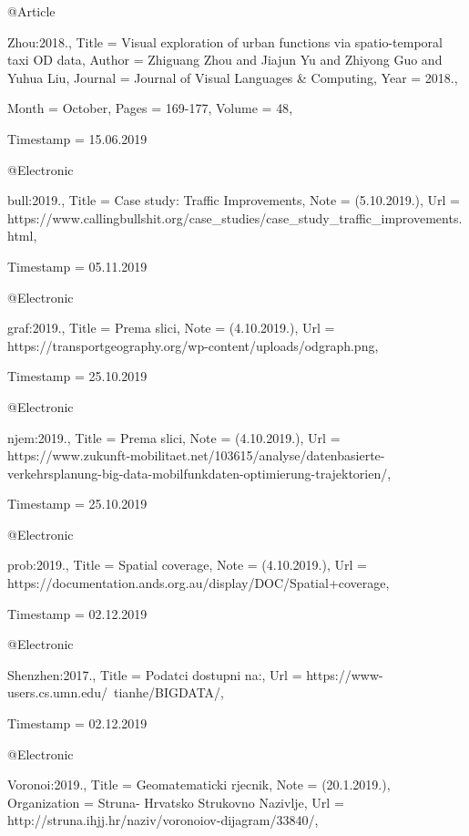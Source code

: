{{{@Article{Zhou:2018.,
  Title                    = {{Visual exploration of urban functions via spatio-temporal taxi OD data}},
  Author                   = {Zhiguang Zhou and Jiajun Yu and Zhiyong Guo and Yuhua Liu},
  Journal                  = {Journal of Visual Languages \& Computing},
  Year                     = {2018.},

  Month                    = {October},
  Pages                    = {169-177},
  Volume                   = {48},

  Timestamp                = {15.06.2019}
}

@Electronic{bull:2019.,
  Title                    = {Case study: Traffic Improvements},
  Note                     = {(5.10.2019.)},
  Url                      = {https://www.callingbullshit.org/case_studies/case_study_traffic_improvements.html},

  Timestamp                = {05.11.2019}
}

@Electronic{graf:2019.,
  Title                    = {Prema slici},
  Note                     = {(4.10.2019.)},
  Url                      = {https://transportgeography.org/wp-content/uploads/odgraph.png},

  Timestamp                = {25.10.2019}
}

@Electronic{njem:2019.,
  Title                    = {Prema slici},
  Note                     = {(4.10.2019.)},
  Url                      = {https://www.zukunft-mobilitaet.net/103615/analyse/datenbasierte-verkehrsplanung-big-data-mobilfunkdaten-optimierung-trajektorien/},

  Timestamp                = {25.10.2019}
}

@Electronic{prob:2019.,
  Title                    = {Spatial coverage},
  Note                     = {(4.10.2019.)},
  Url                      = {https://documentation.ands.org.au/display/DOC/Spatial+coverage},

  Timestamp                = {02.12.2019}
}

@Electronic{Shenzhen:2017.,
  Title                    = {Podatci dostupni na:},
  Url                      = {https://www-users.cs.umn.edu/~tianhe/BIGDATA/},

  Timestamp                = {02.12.2019}
}

@Electronic{Voronoi:2019.,
  Title                    = {Geomatematicki rjecnik},
  Note                     = {(20.1.2019.)},
  Organization             = {Struna- Hrvatsko Strukovno Nazivlje},
  Url                      = {http://struna.ihjj.hr/naziv/voronoiov-dijagram/33840/},

}}}}
